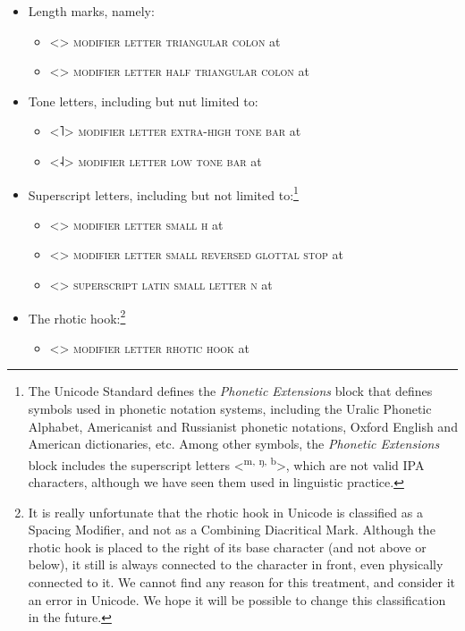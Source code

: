 \begin{itemize}
  
	\item[] Length marks, namely: 
    	\begin{itemize}
    	  \item[] <> \textsc{modifier letter triangular colon} at 
    	  \item[] <> \textsc{modifier letter half triangular colon} at 
    	\end{itemize}
	 
	\item[] Tone letters, including but nut limited to: 
	\begin{itemize} 
	  \item[] <˥> \textsc{modifier letter extra-high tone bar} at 
	  \item[] <˨> \textsc{modifier letter low tone bar} at 
	\end{itemize}
	
	\item[] Superscript letters, including but not limited to:\footnote{The Unicode Standard defines the 
	  \textit{Phonetic Extensions} block that defines symbols used in phonetic notation 
	  systems, including the Uralic Phonetic Alphabet, Americanist and Russianist phonetic notations, 
	  Oxford English and American dictionaries, etc. Among other symbols, the 
	  \textit{Phonetic Extensions} block includes 
	  the superscript letters <\textsuperscript{m, ŋ, b}>, which are not valid 
	  IPA characters, although we have seen them used in linguistic practice.}
	\begin{itemize}
	  \item[] <> \textsc{modifier letter small h} at 
	  \item[] <> \textsc{modifier letter small reversed glottal stop} at 
	  \item[] <> \textsc{superscript latin small letter n} at 
	\end{itemize}
	
	\item[] The rhotic hook:\footnote{It is really unfortunate that the rhotic hook
         in Unicode is classified as a Spacing Modifier, and not as a Combining 
         Diacritical Mark. Although the rhotic hook is placed to the right of its 
         base character (and not above or below), it still is always connected 
         to the character in front, even physically connected to it. We cannot 
         find any reason for this treatment, and consider it an error in 
         Unicode. We hope it will be possible to change this classification in 
         the future.}
	\begin{itemize}
	  \item[] <> \textsc{modifier letter rhotic hook} at 
	\end{itemize}
	
\end{itemize}

